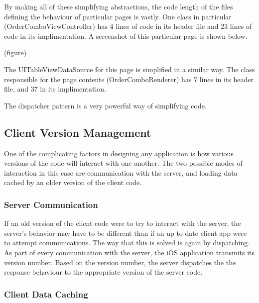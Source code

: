 \documentclass[se]{uw-wkrpt}
\begin{document}
By making all of these simplifying abstractions, the code length of the files defining
the behaviour of particular pages is vastly. One class in particular (OrderComboViewController)
has 4 lines of code in its header file and 23 lines of code in its implimentation. A screenshot
of this particular page is shown below. 

(figure)

The UITableViewDataSource for this page is simplified in a similar way. The class responsible
for the page contents (OrderComboRenderer) has 7 lines in its header file, and 37 in its implimentation.


The dispatcher pattern is a very powerful way of simplifying code.

\subsection{Client Version Management}

One of the complicating factors in designing any application is how various versions of the code will
interact with one another. The two possible modes of interaction in this case are communication with
the server, and loading data cached by an older version of the client code. 

\subsubsection{Server Communication}

If an old version of the client code were to try to interact with the server, the server's behavior
may have to be different than if an up to date client app were to attempt communications. The way that
this is solved is again by dispatching. As part of every communication with the server, the iOS application
transmits its version number. Based on the version number, the server dispatches the the response behaviour
to the appropriate version of the server code.

\subsubsection{Client Data Caching}
\end{document}
